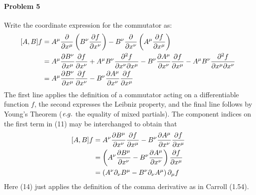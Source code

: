 \documentclass[10pt]{scrartcl}
\newcommand{\eg}{{\textit e.g.}}
\begin{document}
\paragraph{Problem 5}
Write the coordinate expression for the commutator as:
\begin{align*}
	\comm{A}{B}f &= A^{\mu}\pdv{x^{\mu}}\left(B^{\nu}\pdv{f}{x^\nu}\right) - B^{\nu}\pdv{x^{\nu}}\left(A^{\mu}\pdv{f}{x^\mu}\right)	\\
	&= A^{\mu}\pdv{B^{\nu}}{x^{\mu}}\pdv{f}{x^{\nu}} + A^{\mu}B^{\nu}\pdv{f}{x^{\nu}}{x^{\mu}} - B^{\nu}\pdv{A^{\mu}}{x^{\nu}}\pdv{f}{x^{\mu}} - A^{\mu}B^{\nu}\pdv{f}{x^{\mu}}{x^{\nu}}\\
	&= A^{\mu}\pdv{B^{\nu}}{x^{\mu}}\pdv{f}{x^{\nu}}-B^{\nu}\pdv{A^{\mu}}{x^{\nu}}\pdv{f}{x^{\mu}}
\end{align*}
The first line applies the definition of a commutator acting on a differentiable function $f$, the second expresses the Leibniz property, and the final line follows by Young's Theorem ($\eg$ the equality of mixed partials). The component indices on the first term in (11) may be interchanged to obtain that
\begin{align}
	\comm{A}{B}f &= A^{\nu}\pdv{B^{\mu}}{x^{\nu}}\pdv{f}{x^{\mu}}-B^{\nu}\pdv{A^{\mu}}{x^{\nu}}\pdv{f}{x^{\mu}}\\
	&= \left(A^{\nu}\pdv{B^{\mu}}{x^{\nu}}-B^{\nu}\pdv{A^{\mu}}{x^{\nu}}\right)\pdv{f}{x^{\mu}}\\
	&= \left(A^{\nu}\partial_{\nu}B^{\mu} - B^{\nu}\partial_{\nu}A^{\mu}\right)\partial_{\mu} f
\end{align}
Here (14) just applies the definition of the comma derivative as in Carroll (1.54). 
\end{document}
